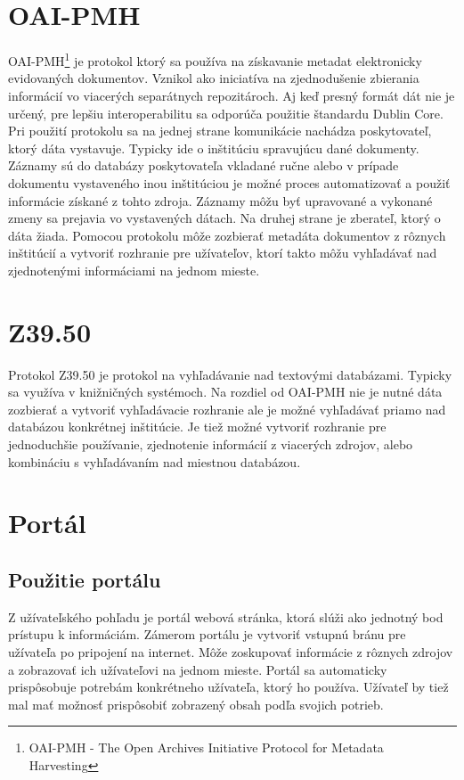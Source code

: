 \documentclass[
  print, %
  table,   %
  lof,     %
  nolot,     %
]{fithesis3}
\begin{document}
\section{OAI-PMH}
OAI-PMH\footnote{OAI-PMH - The Open Archives Initiative Protocol for Metadata Harvesting} je protokol ktorý sa používa na získavanie metadat elektronicky evidovaných dokumentov. Vznikol ako iniciatíva na zjednodušenie zbierania informácií vo viacerých separátnych repozitároch. Aj keď presný formát dát nie je určený, pre lepšiu interoperabilitu sa odporúča použitie štandardu Dublin Core.\cite{dublin-core} Pri použití protokolu sa na jednej strane komunikácie nachádza poskytovateľ, ktorý dáta vystavuje. Typicky ide o inštitúciu spravujúcu dané dokumenty. Záznamy sú do databázy poskytovateľa vkladané ručne alebo v prípade dokumentu vystaveného inou inštitúciou je možné proces automatizovať a použiť informácie získané z tohto zdroja. Záznamy môžu byť upravované a vykonané zmeny sa prejavia vo vystavených dátach. Na druhej strane je zberateľ, ktorý o dáta žiada. Pomocou protokolu môže zozbierať metadáta dokumentov z rôznych inštitúcií a vytvoriť rozhranie pre užívateľov, ktorí takto môžu vyhľadávať nad zjednotenými informáciami na jednom mieste.\cite{oai1}\cite{oai2}
\section{Z39.50}
Protokol Z39.50 je protokol na vyhľadávanie nad textovými databázami. Typicky sa využíva v knižničných systémoch. Na rozdiel od OAI-PMH nie je nutné dáta zozbierať a vytvoriť vyhľadávacie rozhranie ale je možné vyhľadávať priamo nad databázou konkrétnej inštitúcie. Je tiež možné vytvoriť rozhranie pre jednoduchšie používanie, zjednotenie informácií z viacerých zdrojov, alebo kombináciu s vyhľadávaním nad miestnou databázou. \cite{z39501}\cite{z39502}      
\section{Portál}
\subsection{Použitie portálu}
Z užívateľského pohľadu je portál webová stránka, ktorá slúži ako jednotný bod prístupu k informáciám. Zámerom portálu je vytvoriť vstupnú bránu pre užívateľa po pripojení na internet. Môže zoskupovať informácie z rôznych zdrojov a zobrazovať ich užívateľovi na jednom mieste. Portál sa automaticky prispôsobuje potrebám konkrétneho užívateľa, ktorý ho používa. Užívateľ by tiež mal mať možnosť prispôsobiť zobrazený obsah podľa svojich potrieb.\cite{portal-common1}
\end{document}
